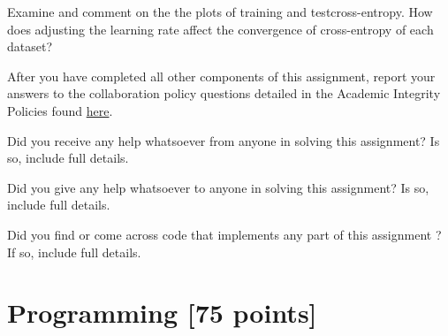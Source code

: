 \documentclass[11pt]{exam}
\numberwithin{equation}{section} %
\numberwithin{figure}{section} %
\numberwithin{table}{section} %
\newcommand{\ntset}{test}
\begin{document}
\begin{questions}
 \begin{tcolorbox}[fit,height=18cm, width=15cm, blank, borderline={1pt}{-2pt}]
    \end{tcolorbox}




\clearpage
\question[1] 
Examine and comment on the the plots of training and \ntset\thinspace cross-entropy. How does adjusting the learning rate affect the convergence of cross-entropy of each dataset?

 \begin{tcolorbox}[fit,height=10cm, width=15cm, blank, borderline={1pt}{-2pt}]
    \end{tcolorbox}


\question[0] After you have completed all other components of this assignment, report your answers to the collaboration policy questions detailed in the Academic Integrity Policies found \href{http://www.cs.cmu.edu/~mgormley/courses/10601bd-f18/about.html#7-academic-integrity-policies}{here}.
    \begin{enumerate*}
        \item Did you receive any help whatsoever from anyone in solving this assignment? Is so, include full details.
        \item Did you give any help whatsoever to anyone in solving this assignment? Is so, include full details.
        \item Did you find or come across code that implements any part of this assignment ? If so, include full details.
    \end{enumerate*}

\begin{tcolorbox}[fit,height=8cm, width=15cm, blank, borderline={1pt}{-2pt}]
    \end{tcolorbox}

\end{questions}\clearpage

\section{Programming [75 points]}
\label{sec:code}
\end{document}
